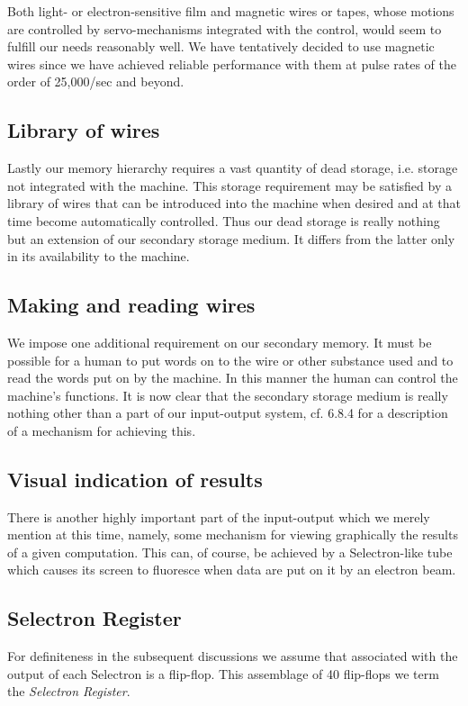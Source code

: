 \documentclass[12pt]{amsart}
\begin{document}
Both light- or electron-sensitive film and magnetic wires or tapes, whose motions are controlled by servo-mechanisms integrated with the control, would seem to fulfill our needs reasonably well. We have tentatively decided to use magnetic wires since we have achieved reliable performance with them at pulse rates of the order of 25,000/sec and beyond.

\subsection{Library of wires}
Lastly our memory hierarchy requires a vast quantity of dead storage, i.e. storage not integrated with the machine. This storage requirement may be satisfied by a library of wires that can be introduced into the machine when desired and at that time become automatically controlled. Thus our dead storage is really nothing but an extension of our secondary storage medium. It differs from the latter only in its availability to the machine.

\subsection{Making and reading wires}
We impose one additional requirement on our secondary memory. It must be possible for a human to put words on to the wire or other substance used and to read the words put on by the machine. In this manner the human can control the machine's functions. It is now clear that the secondary storage medium is really nothing other than a part of our input-output system, cf. 6.8.4 for a description of a mechanism for achieving this.

\subsection{Visual indication of results}
There is another highly important part of the input-output which we merely mention at this time, namely, some mechanism for viewing graphically the results of a given computation. This can, of course, be achieved by a Selectron-like tube which causes its screen to fluoresce when data are put on it by an electron beam.

\subsection{Selectron Register}
For definiteness in the subsequent discussions we assume that associated with the output of each Selectron is a flip-flop. This assemblage of 40 flip-flops we term the \emph{Selectron Register}.
\end{document}
